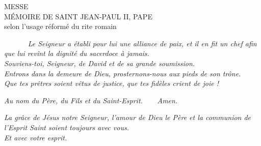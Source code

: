 \documentclass[twoside]{article}
\begin{document}
\null \newpage

\sloppy

\begin{center}\begin{doublespace}
{
\MakeUppercase{\Large Messe\\Mémoire de saint Jean-Paul II, pape}\\
selon l'usage réformé du rite romain
}
\end{doublespace}\end{center}


~~~~~~
\emph{\rr Le Seigneur a établi pour lui une alliance de paix, et il en fit un chef afin que lui revînt la dignité du sacerdoce à jamais.\\
\vv {} Souviens-toi, Seigneur, de David et de sa grande soumission.\\
\vv {} Entrons dans la demeure de Dieu, prosternons-nous aux pieds de son trône.\\
\vv {} Que tes prêtres soient vêtus de justice, que tes fidèles crient de joie !}

\vspace{3cm}


\emph{\vv Au nom du Père, du Fils et du Saint-Esprit.~~~~\rr Amen.}


\emph{\vv La grâce de Jésus notre Seigneur, l'amour de Dieu le Père et la communion de l'Esprit Saint soient toujours avec vous. \\
\rr Et avec votre esprit.}
\end{document}
